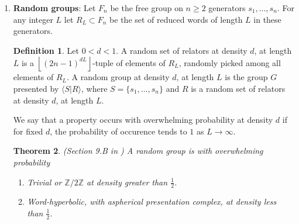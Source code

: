 \documentclass[a4paper,11pt]{article}
\theoremstyle{definition}
\newtheorem{definition}{Definition}[section]
\theoremstyle{plain}
\newtheorem{theorem}[definition]{Theorem}
\theoremstyle{remark}
\begin{document}
{\begin{enumerate}
$(X,x_{0})$ is the inverse limit of the sequence 
\begin{align*}
(P,\ast)\xleftarrow{f} (P,\ast)\xleftarrow{g} (P,\ast) \xleftarrow{f} (P,\ast) \xleftarrow{g} \dots
\end{align*}
Analogously, the inverse limit of 
\begin{align*}
(P,e)\xleftarrow{f} (P,e)\xleftarrow{g} (P,e) \xleftarrow{f} (P,e) \xleftarrow{g} \dots
\end{align*}
is homeomorphic to $(X,x_1)$ for a suitable $x_1\in X$. We have that $\pi_{n}^c(cX,c\{x_0\})=\pi_{n}^c(cX,c\{x_1\})=0$ for $n\geq 2$. By definition $\pi_0^c(cX,c\{x_0\})\cong \pi_{n}^c(cX,c\{x_1\})$ since it is only a pointed set. However, it can be shown that
\begin{align*}
\pi_{1}^c(cX,c\{x_0\}) \cong \check{\pi}_{1}(X,x_0) \cong \mathbb{Z}\\
\pi_{1}^c(cX,c\{x_1\}) \cong \check{\pi}_{1}(X,x_1) =0
\end{align*}
See Example 4 of Ch. II §3.3 in \cite{mardesic1982shape} for the details of this computation. 


\item \textbf{Random groups}: Let $F_n$ be the free group on $n\geq 2$ generators $s_{1},\dots, s_{n}$. For any integer $L$ let $R_{L}\subset F_{n}$ be the set of reduced words of length $L$ in these generators. 

\begin{definition} Let $0<d<1$. A random set of relators at density $d$, at length $L$ is a $\left \lfloor{(2n-1)^{dL}}\right\rfloor$-tuple of elements of $R_{L}$, randomly picked among all elements of $R_{L}$. A random group at density $d$, at length $L$ is the group $G$ presented by $\langle S|R \rangle $, where $S = \{s_1,\dots, s_n\}$ and $R$ is a random set of relators at density $d$, at length $L$. 
\end{definition} 

We say that a property occurs with overwhelming probability at density $d$ if for fixed $d$, the probability of occurence tends to $1$ as $L\rightarrow \infty$. 

\begin{theorem} (Section 9.B in \cite{gromov1992asymptotic}) A random group is with overwhelming probability 
\begin{enumerate}
\item Trivial or $\mathbb{Z}/2\mathbb{Z}$ at density greater than $\frac{1}{2}$.
\item Word-hyperbolic, with aspherical presentation complex, at density less than $\frac{1}{2}$.
\end{enumerate}
\end{theorem}


\end{enumerate}}
\end{document}

